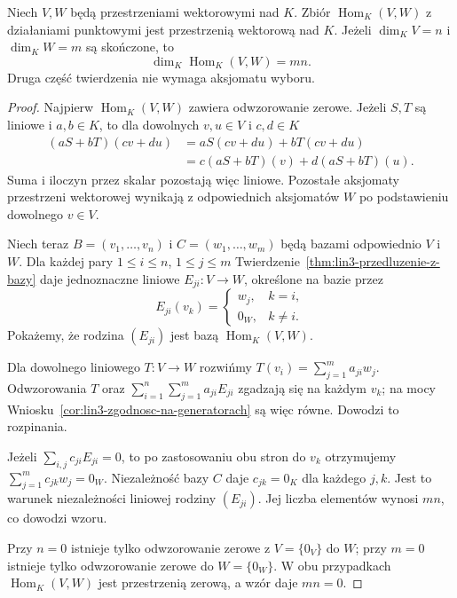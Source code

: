 \begin{twierdzenie}
\label{thm:lin3-hom-przestrzen}
Niech \(V,W\) będą przestrzeniami wektorowymi nad \(K\).
Zbiór \(\operatorname{Hom}_K(V,W)\)
z działaniami punktowymi jest przestrzenią wektorową nad \(K\).
Jeżeli \(\dim_KV=n\) i \(\dim_KW=m\)
są skończone, to
\[
 \dim_K\operatorname{Hom}_K(V,W)=mn.
\]
Druga część twierdzenia nie wymaga aksjomatu wyboru.
\end{twierdzenie}
\begin{proof}
Najpierw \(\operatorname{Hom}_K(V,W)\)
zawiera odwzorowanie zerowe.
Jeżeli \(S,T\) są liniowe i \(a,b\in K\),
to dla dowolnych \(v,u\in V\) i \(c,d\in K\)
\[
 \begin{aligned}
 (aS+bT)(cv+du)
  &=aS(cv+du)+bT(cv+du)\\
  &=c(aS+bT)(v)+d(aS+bT)(u).
 \end{aligned}
\]
Suma i iloczyn przez skalar pozostają więc liniowe.
Pozostałe aksjomaty przestrzeni wektorowej
wynikają z odpowiednich aksjomatów \(W\)
po podstawieniu dowolnego \(v\in V\).

Niech teraz \(B=(v_1,\ldots,v_n)\)
i \(C=(w_1,\ldots,w_m)\) będą bazami odpowiednio
\(V\) i \(W\).
Dla każdej pary \(1\leq i\leq n\),
\(1\leq j\leq m\) Twierdzenie~\ref{thm:lin3-przedluzenie-z-bazy}
daje jednoznaczne liniowe \(E_{ji}\colon V\to W\),
określone na bazie przez
\[
 E_{ji}(v_k)=
 \begin{cases}
   w_j,&k=i,\\
   0_W,&k\neq i.
 \end{cases}
\]
Pokażemy, że rodzina \((E_{ji})\) jest bazą
\(\operatorname{Hom}_K(V,W)\).

Dla dowolnego liniowego \(T\colon V\to W\)
rozwińmy \(T(v_i)=\sum_{j=1}^{m}a_{ji}w_j\).
Odwzorowania \(T\) oraz
\(\sum_{i=1}^{n}\sum_{j=1}^{m}a_{ji}E_{ji}\)
zgadzają się na każdym \(v_k\);
na mocy Wniosku~\ref{cor:lin3-zgodnosc-na-generatorach}
są więc równe. Dowodzi to rozpinania.

Jeżeli \(\sum_{i,j}c_{ji}E_{ji}=0\),
to po zastosowaniu obu stron do \(v_k\)
otrzymujemy \(\sum_{j=1}^{m}c_{jk}w_j=0_W\).
Niezależność bazy \(C\) daje
\(c_{jk}=0_K\) dla każdego \(j,k\).
Jest to warunek niezależności liniowej
rodziny \((E_{ji})\). Jej liczba elementów
wynosi \(mn\), co dowodzi wzoru.

Przy \(n=0\) istnieje tylko odwzorowanie zerowe
z \(V=\{0_V\}\) do \(W\); przy \(m=0\)
istnieje tylko odwzorowanie zerowe do \(W=\{0_W\}\).
W obu przypadkach \(\operatorname{Hom}_K(V,W)\)
jest przestrzenią zerową, a wzór daje \(mn=0\).
\end{proof}

